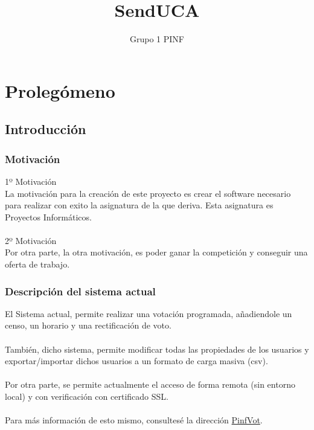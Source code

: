 \documentclass[12pt,letterpaper]{report}
\title{SendUCA}
\author{Grupo 1 PINF}
\begin{document}
	\maketitle
	\thispagestyle{empty}
	\newpage
	\tableofcontents
	
	
	
	\lstset{language=bash, numbers=left, numberstyle=\tiny, numbersep=10pt, firstnumber=1, stepnumber=1}
	
\chapter{Prolegómeno}		
\section{Introducción}
	\subsection{Motivación}
		\noindent 1º Motivación\\
		La motivación para la creación de este proyecto es crear el software necesario
		para realizar con exito la asignatura de la que deriva. Esta asignatura es Proyectos Informáticos.
		\\~\\
		\noindent 2º Motivación\\
		Por otra parte, la otra motivación, es poder ganar la competición y conseguir
		una oferta de trabajo.
	\subsection{Descripción del sistema actual}
		El Sistema actual, permite realizar una votación programada, añadiendole un censo, un horario
		y una rectificación de voto.
		\\~\\
		También, dicho sistema, permite modificar todas las propiedades de los usuarios y exportar/importar
		dichos usuarios a un formato de carga masiva (csv).
		\\~\\
		Por otra parte, se permite actualmente el acceso de forma remota (sin entorno local) y con verificación
		con certificado SSL.
		\\~\\
		Para más información de esto mismo, consultesé la dirección \href{https://pinfvot.herokuapp.com/}{PinfVot}.
\end{document}
